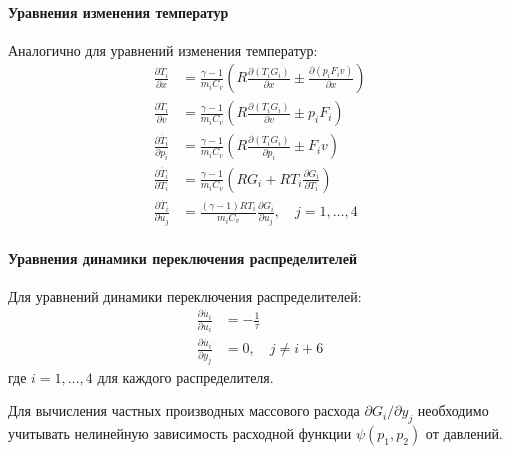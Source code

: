 \paragraph{Уравнения изменения температур}
Аналогично для уравнений изменения температур:
\begin{equation}
\label{eq:ch2/jacobian_temperature}
    \begin{aligned}
        \frac{\partial \dot{T_i}}{\partial x}   & = \frac{\gamma-1}{m_iC_v}\left(R\frac{\partial (T_iG_i)}{\partial x} \pm \frac{\partial (p_iF_iv)}{\partial x}\right) \\
        \frac{\partial \dot{T_i}}{\partial v}   & = \frac{\gamma-1}{m_iC_v}\left(R\frac{\partial (T_iG_i)}{\partial v} \pm p_iF_i\right)                                \\
        \frac{\partial \dot{T_i}}{\partial p_i} & = \frac{\gamma-1}{m_iC_v}\left(R\frac{\partial (T_iG_i)}{\partial p_i} \pm F_iv\right)                                \\
        \frac{\partial \dot{T_i}}{\partial T_i} & = \frac{\gamma-1}{m_iC_v}\left(RG_i + RT_i\frac{\partial G_i}{\partial T_i}\right)                                    \\
        \frac{\partial \dot{T_i}}{\partial u_j} & = \frac{(\gamma-1)RT_i}{m_iC_v}\frac{\partial G_i}{\partial u_j}, \quad j = 1, \ldots, 4
    \end{aligned}
\end{equation}

\paragraph{Уравнения динамики переключения распределителей}
Для уравнений динамики переключения распределителей:
\begin{equation}
\label{eq:ch2/jacobian_valves}
    \begin{aligned}
        \frac{\partial \dot{u_i}}{\partial u_i} & = -\frac{1}{\tau}     \\
        \frac{\partial \dot{u_i}}{\partial y_j} & = 0, \quad j \neq i+6
    \end{aligned}
\end{equation}
где $i = 1, \ldots, 4$ для каждого распределителя.

Для вычисления частных производных массового расхода $\partial G_i/\partial y_j$ необходимо учитывать нелинейную
зависимость расходной функции $\psi(p_1, p_2)$ от давлений.

